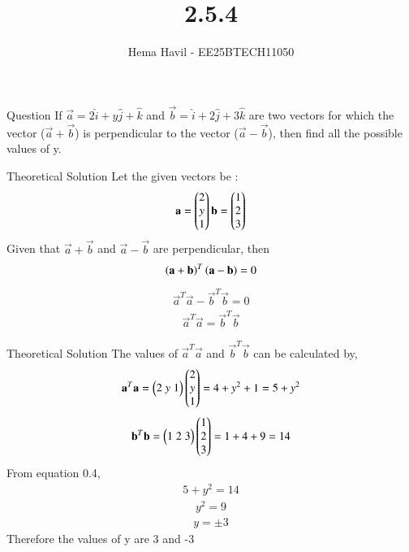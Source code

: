 \documentclass{beamer}
\title %
{2.5.4}
\author %
{Hema Havil - EE25BTECH11050}
\begin{document}
	
	\frame{\titlepage}
	\begin{frame}{Question}
		If $\vec{a}=2\hat{i}+y\hat{j}+\hat{k}$ and $\vec{b}=\hat{i}+2\hat{j}+3\hat{k}$ are two vectors for which the vector ($\vec{a}+\vec{b}$) is perpendicular to the vector ($\vec{a}-\vec{b}$), then find all the possible values of y.
	\end{frame}

	
\begin{frame}{Theoretical Solution}
         Let the given vectors be :\\ 
         \begin{align}
             \mathbf{a}=\begin{pmatrix}2\\y\\1\end{pmatrix}  \mathbf{b}=\begin{pmatrix}1\\2\\3\end{pmatrix}
         \end{align}
         Given that $\vec{a}+\vec{b}$ and $\vec{a}-\vec{b}$  are perpendicular, then \\
         \begin{align}
             \left(\mathbf{a}+\mathbf{b}\right)^T\left(\mathbf{a}-\mathbf{b}\right)=0
         \end{align}
         \begin{align}
             \vec{a}^T\vec{a}-\vec{b}^T\vec{b}=0
         \end{align}
         \begin{align}
             \vec{a}^T\vec{a}=\vec{b}^T\vec{b}
         \end{align}
\end{frame}
\begin{frame}{Theoretical Solution}
The values of $\vec{a}^T\vec{a}$ and $\vec{b}^T\vec{b}$ can be calculated by,
         \begin{align}
             \mathbf{a}^T\mathbf{a}=\begin{pmatrix}2\;y\;1\end{pmatrix}\begin{pmatrix}2\\y\\1\end{pmatrix}=4+y^2+1=5+y^2
         \end{align}
         \begin{align}
             \mathbf{b}^T\mathbf{b}=\begin{pmatrix}1\;2\;3\end{pmatrix}\begin{pmatrix}1\\2\\3\end{pmatrix}=1+4+9=14
         \end{align}
         From equation 0.4,\\
         \begin{align}
             5+y^2=14
         \end{align}
         \begin{align}
             y^2=9
         \end{align}
         \begin{align}
             y=\pm3
         \end{align}
         Therefore the values of y are 3 and -3
	\end{frame}
    
\end{document}
